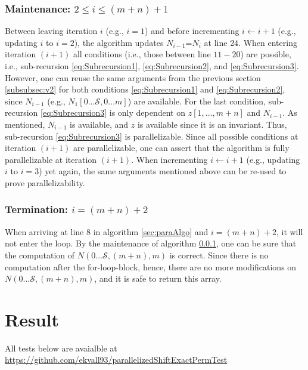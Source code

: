 \documentclass[a4paper]{article}
\begin{document}
\subsubsection{Maintenance: $2\leq i \leq (m+n)+1$}
\label{subsubsec:maintenance}
Between leaving iteration $i$ (e.g., $i=1$) and before incrementing $i\leftarrow i+1$ (e.g., updating $i$ to $i=2$), the algorithm updates $N_{i-1}$=$N_{i}$ at line $24$. When entering iteration $(i+1)$ all conditions (i.e., those between line $11-20$) are possible, i.e., sub-recursion \ref{eq:Subrecursion1}, \ref{eq:Subrecursion2}, and \ref{eq:Subrecursion3}. However, one can reuse the same arguments from the previous section \ref{subsubsec:v2} for both conditions \ref{eq:Subrecursion1} and \ref{eq:Subrecursion2}, since $N_{i-1}$ (e.g., $N_{1}[0...\mathcal{S},0...m]$) are available. For the last condition, sub-recursion \ref{eq:Subrecursion3} is only dependent on $z[1,\ldots,m+n]$ and $N_{i-1}$. As mentioned, $N_{i-1}$ is available, and $z$ is available since it is an invariant. Thus, sub-recursion \ref{eq:Subrecursion3} is parallelizable. Since all possible conditions at iteration $(i+1)$ are parallelizable, one can assert that the algorithm is fully parallelizable at iteration $(i+1)$.
When incrementing $i\leftarrow i+1$ (e.g., updating $i$ to $i=3$) yet again, the same arguments mentioned above can be re-used to prove parallelizability.
\subsubsection{Termination: $i=(m+n)+2$}
When arriving at line $8$ in algorithm \ref{sec:paraAlgo} and $i=(m+n)+2$, it will not enter the loop. By the maintenance of algorithm \ref{subsubsec:maintenance}, one can be sure that the computation of $N(0...\mathcal{S},(m+n),m)$ is correct. Since there is no computation after the for-loop-block, hence, there are no more modifications on $N(0...\mathcal{S},(m+n),m)$, and it is safe to return this array. 
\section{Result}
\label{sec:result}
All tests below are avaialble at \href{https://github.com/ekvall93/parallelizedShiftExactPermTest}{https://github.com/ekvall93/parallelizedShiftExactPermTest}
\end{document}
